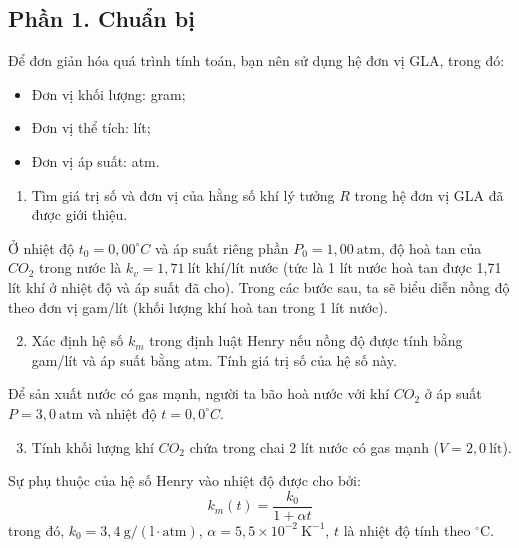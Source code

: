 \subsection*{Phần 1. Chuẩn bị}
\noindent Để đơn giản hóa quá trình tính toán, bạn nên sử dụng hệ đơn vị GLA, trong đó:
\begin{itemize}
  \item Đơn vị khối lượng: gram;
  \item Đơn vị thể tích: lít;
  \item Đơn vị áp suất: atm.
\end{itemize}
\begin{enumerate}
  \item Tìm giá trị số và đơn vị của hằng số khí lý tưởng $R$ trong hệ đơn vị GLA đã được giới thiệu.
\end{enumerate}
\noindent Ở nhiệt độ $t_0 = 0{,}00^\circ C$ và áp suất riêng phần $P_0 = 1{,}00~\text{atm}$, độ hoà tan của $CO_2$ trong nước là $k_v = 1{,}71~\text{lít khí}/\text{lít nước}$ (tức là 1 lít nước hoà tan được 1,71 lít khí ở nhiệt độ và áp suất đã cho). Trong các bước sau, ta sẽ biểu diễn nồng độ theo đơn vị gam/lít (khối lượng khí hoà tan trong 1 lít nước).
\begin{enumerate}
  \setcounter{enumi}{1}
  \item Xác định hệ số $k_m$ trong định luật Henry nếu nồng độ được tính bằng gam/lít và áp suất bằng atm. Tính giá trị số của hệ số này.
\end{enumerate}
\noindent Để sản xuất nước có gas mạnh, người ta bão hoà nước với khí $CO_2$ ở áp suất $P = 3{,}0~\text{atm}$ và nhiệt độ $t = 0{,}0^\circ C$.
\begin{enumerate}
  \setcounter{enumi}{2}
  \item Tính khối lượng khí $CO_2$ chứa trong chai 2 lít nước có gas mạnh ($V = 2{,}0~\text{lít}$).
\end{enumerate}
\noindent Sự phụ thuộc của hệ số Henry vào nhiệt độ được cho bởi:
\begin{equation*}
  k_m(t) = \frac{k_0}{1 + \alpha t}
\end{equation*}
trong đó, $k_0 = 3{,}4~\text{g}/(\text{l} \cdot \text{atm})$, $\alpha = 5{,}5 \times 10^{-2}~\text{K}^{-1}$, $t$ là nhiệt độ tính theo ${}^\circ$C.

